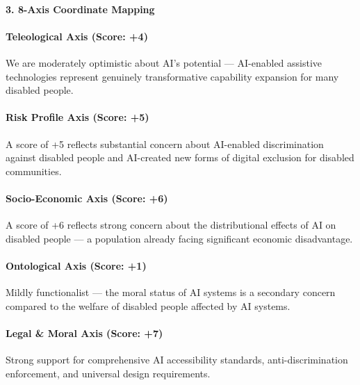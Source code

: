 \paragraph{3. 8-Axis Coordinate
Mapping}\label{axis-coordinate-mapping-40}

\paragraph{Teleological Axis (Score:
+4)}\label{teleological-axis-score-4-4}

We are moderately optimistic about AI's potential --- AI-enabled
assistive technologies represent genuinely transformative capability
expansion for many disabled people.

\paragraph{Risk Profile Axis (Score:
+5)}\label{risk-profile-axis-score-5-3}

A score of +5 reflects substantial concern about AI-enabled
discrimination against disabled people and AI-created new forms of
digital exclusion for disabled communities.

\paragraph{Socio-Economic Axis (Score:
+6)}\label{socio-economic-axis-score-6-3}

A score of +6 reflects strong concern about the distributional effects
of AI on disabled people --- a population already facing significant
economic disadvantage.

\paragraph{Ontological Axis (Score:
+1)}\label{ontological-axis-score-1-1}

Mildly functionalist --- the moral status of AI systems is a secondary
concern compared to the welfare of disabled people affected by AI
systems.

\paragraph{Legal \& Moral Axis (Score:
+7)}\label{legal-moral-axis-score-7-3}

Strong support for comprehensive AI accessibility standards,
anti-discrimination enforcement, and universal design requirements.

